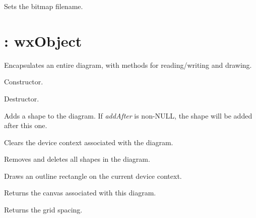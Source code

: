 Sets the bitmap filename.

\section{: wxObject}\label{wxdiagram}

Encapsulates an entire diagram, with methods for reading/writing and drawing.



Constructor.



Destructor.



Adds a shape to the diagram. If {\it addAfter} is non-NULL, the shape will be added after this
one.



Clears the device context associated with the diagram.



Removes and deletes all shapes in the diagram.



Draws an outline rectangle on the current device context.



Returns the canvas associated with this diagram.



Returns the grid spacing.



